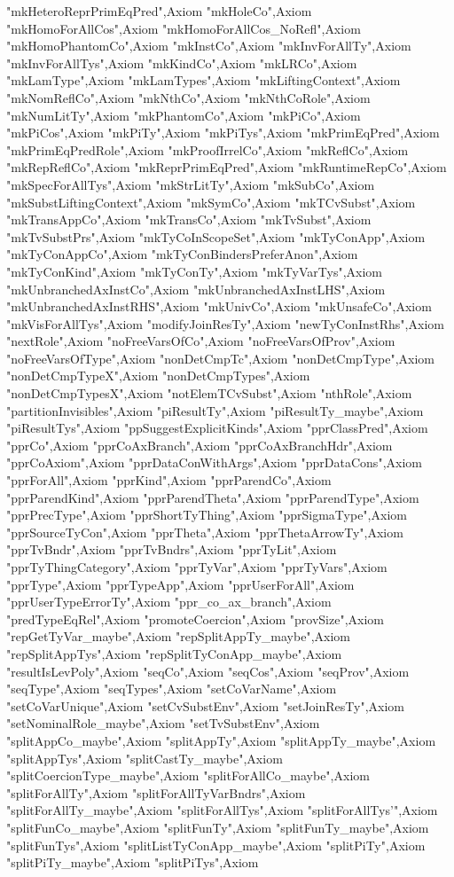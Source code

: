 {"mkHeteroReprPrimEqPred"},{Axiom "mkHoleCo"},{Axiom "mkHomoForAllCos"},{Axiom "mkHomoForAllCos_NoRefl"},{Axiom "mkHomoPhantomCo"},{Axiom "mkInstCo"},{Axiom "mkInvForAllTy"},{Axiom "mkInvForAllTys"},{Axiom "mkKindCo"},{Axiom "mkLRCo"},{Axiom "mkLamType"},{Axiom "mkLamTypes"},{Axiom "mkLiftingContext"},{Axiom "mkNomReflCo"},{Axiom "mkNthCo"},{Axiom "mkNthCoRole"},{Axiom "mkNumLitTy"},{Axiom "mkPhantomCo"},{Axiom "mkPiCo"},{Axiom "mkPiCos"},{Axiom "mkPiTy"},{Axiom "mkPiTys"},{Axiom "mkPrimEqPred"},{Axiom "mkPrimEqPredRole"},{Axiom "mkProofIrrelCo"},{Axiom "mkReflCo"},{Axiom "mkRepReflCo"},{Axiom "mkReprPrimEqPred"},{Axiom "mkRuntimeRepCo"},{Axiom "mkSpecForAllTys"},{Axiom "mkStrLitTy"},{Axiom "mkSubCo"},{Axiom "mkSubstLiftingContext"},{Axiom "mkSymCo"},{Axiom "mkTCvSubst"},{Axiom "mkTransAppCo"},{Axiom "mkTransCo"},{Axiom "mkTvSubst"},{Axiom "mkTvSubstPrs"},{Axiom "mkTyCoInScopeSet"},{Axiom "mkTyConApp"},{Axiom "mkTyConAppCo"},{Axiom "mkTyConBindersPreferAnon"},{Axiom "mkTyConKind"},{Axiom "mkTyConTy"},{Axiom "mkTyVarTys"},{Axiom "mkUnbranchedAxInstCo"},{Axiom "mkUnbranchedAxInstLHS"},{Axiom "mkUnbranchedAxInstRHS"},{Axiom "mkUnivCo"},{Axiom "mkUnsafeCo"},{Axiom "mkVisForAllTys"},{Axiom "modifyJoinResTy"},{Axiom "newTyConInstRhs"},{Axiom "nextRole"},{Axiom "noFreeVarsOfCo"},{Axiom "noFreeVarsOfProv"},{Axiom "noFreeVarsOfType"},{Axiom "nonDetCmpTc"},{Axiom "nonDetCmpType"},{Axiom "nonDetCmpTypeX"},{Axiom "nonDetCmpTypes"},{Axiom "nonDetCmpTypesX"},{Axiom "notElemTCvSubst"},{Axiom "nthRole"},{Axiom "partitionInvisibles"},{Axiom "piResultTy"},{Axiom "piResultTy_maybe"},{Axiom "piResultTys"},{Axiom "ppSuggestExplicitKinds"},{Axiom "pprClassPred"},{Axiom "pprCo"},{Axiom "pprCoAxBranch"},{Axiom "pprCoAxBranchHdr"},{Axiom "pprCoAxiom"},{Axiom "pprDataConWithArgs"},{Axiom "pprDataCons"},{Axiom "pprForAll"},{Axiom "pprKind"},{Axiom "pprParendCo"},{Axiom "pprParendKind"},{Axiom "pprParendTheta"},{Axiom "pprParendType"},{Axiom "pprPrecType"},{Axiom "pprShortTyThing"},{Axiom "pprSigmaType"},{Axiom "pprSourceTyCon"},{Axiom "pprTheta"},{Axiom "pprThetaArrowTy"},{Axiom "pprTvBndr"},{Axiom "pprTvBndrs"},{Axiom "pprTyLit"},{Axiom "pprTyThingCategory"},{Axiom "pprTyVar"},{Axiom "pprTyVars"},{Axiom "pprType"},{Axiom "pprTypeApp"},{Axiom "pprUserForAll"},{Axiom "pprUserTypeErrorTy"},{Axiom "ppr_co_ax_branch"},{Axiom "predTypeEqRel"},{Axiom "promoteCoercion"},{Axiom "provSize"},{Axiom "repGetTyVar_maybe"},{Axiom "repSplitAppTy_maybe"},{Axiom "repSplitAppTys"},{Axiom "repSplitTyConApp_maybe"},{Axiom "resultIsLevPoly"},{Axiom "seqCo"},{Axiom "seqCos"},{Axiom "seqProv"},{Axiom "seqType"},{Axiom "seqTypes"},{Axiom "setCoVarName"},{Axiom "setCoVarUnique"},{Axiom "setCvSubstEnv"},{Axiom "setJoinResTy"},{Axiom "setNominalRole_maybe"},{Axiom "setTvSubstEnv"},{Axiom "splitAppCo_maybe"},{Axiom "splitAppTy"},{Axiom "splitAppTy_maybe"},{Axiom "splitAppTys"},{Axiom "splitCastTy_maybe"},{Axiom "splitCoercionType_maybe"},{Axiom "splitForAllCo_maybe"},{Axiom "splitForAllTy"},{Axiom "splitForAllTyVarBndrs"},{Axiom "splitForAllTy_maybe"},{Axiom "splitForAllTys"},{Axiom "splitForAllTys'"},{Axiom "splitFunCo_maybe"},{Axiom "splitFunTy"},{Axiom "splitFunTy_maybe"},{Axiom "splitFunTys"},{Axiom "splitListTyConApp_maybe"},{Axiom "splitPiTy"},{Axiom "splitPiTy_maybe"},{Axiom "splitPiTys"},{Axiom }

